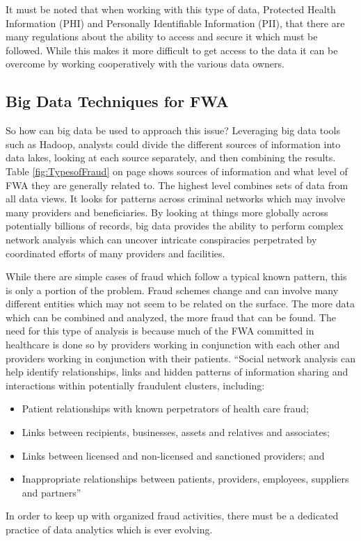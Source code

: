 \documentclass[sigconf]{acmart}
\begin{document}
It must be noted that when working with this type of data, Protected Health Information
(PHI) and Personally Identifiable Information (PII), that there are many regulations about
the ability to access and secure it which must be followed.  While this makes it more
difficult to get access to the data it can be overcome by working cooperatively with the 
various data owners.  
  

\subsection{Big Data Techniques for FWA}

So how can big data be used to approach this issue?  Leveraging big data tools such as 
Hadoop, analysts could divide the different sources of information into data lakes, 
looking at each source separately, and then combining the results.  Table 
\ref{fig:TypesofFraud} on page \pageref{fig:TypesofFraud} shows sources of information 
and what level of FWA they are generally related to.  The highest level combines sets 
of data from all data views.  It looks for patterns across criminal networks which may 
involve many providers and beneficiaries.  By looking at things more globally across 
potentially billions of records, big data provides the ability to perform complex 
network analysis which can uncover intricate conspiracies perpetrated by coordinated 
efforts of many providers and facilities.\cite{THORNTON20131252} 

While there are simple cases of fraud which follow 
a typical known pattern, this is only a portion of the problem.  Fraud schemes 
change and can involve many different entities which may not seem to be related on the 
surface.  The more data which can be combined and analyzed, the more fraud that can be 
found.  The need for this type of analysis is because much of the FWA committed in 
healthcare is done so by providers working in conjunction with each other and providers 
working in conjunction with their patients.\cite{LexisNexis}  ``Social network analysis 
can help identify relationships, links and hidden patterns of information sharing and 
interactions within potentially fraudulent clusters, including:  
\begin{itemize}
  \item Patient relationships with known perpetrators of health care fraud;
  \item Links between recipients, businesses, assets and relatives and associates;
  \item Links between licensed and non-licensed and sanctioned providers; and
  \item Inappropriate relationships between patients, providers, employees, suppliers 
  and partners''\cite{LexisNexis}
\end{itemize}
In order to keep up with organized fraud activities, there must be a dedicated practice 
of data analytics which is ever evolving. 
\end{document}
